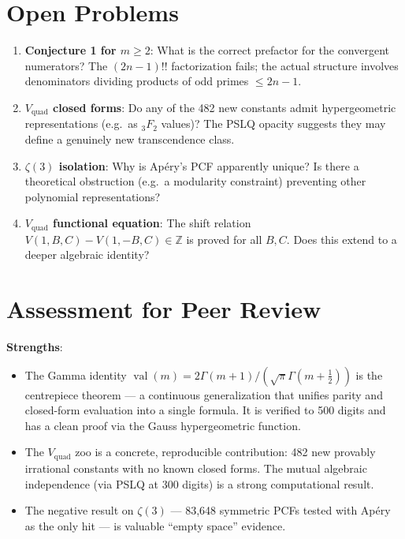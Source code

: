 \documentclass[11pt,a4paper]{article}
\begin{document}
\section{Open Problems}

\begin{enumerate}
\item \textbf{Conjecture 1 for $m \ge 2$}: What is the correct prefactor for the convergent numerators?  The $(2n{-}1)!!$ factorization fails; the actual structure involves denominators dividing products of odd primes $\le 2n{-}1$.
\item \textbf{$V_{\mathrm{quad}}$ closed forms}: Do any of the 482 new constants admit hypergeometric representations (e.g.\ as ${}_3F_2$ values)?  The PSLQ opacity suggests they may define a genuinely new transcendence class.
\item \textbf{$\zeta(3)$ isolation}: Why is Ap\'ery's PCF apparently unique?  Is there a theoretical obstruction (e.g.\ a modularity constraint) preventing other polynomial representations?
\item \textbf{$V_{\mathrm{quad}}$ functional equation}: The shift relation $V(1,B,C) - V(1,-B,C) \in \mathbb{Z}$ is proved for all $B, C$.  Does this extend to a deeper algebraic identity?
\end{enumerate}

\section{Assessment for Peer Review}

\textbf{Strengths}:
\begin{itemize}
\item The Gamma identity $\operatorname{val}(m) = 2\Gamma(m{+}1)/(\sqrt{\pi}\Gamma(m{+}\tfrac{1}{2}))$ is the centrepiece theorem — a continuous generalization that unifies parity and closed-form evaluation into a single formula.  It is verified to 500 digits and has a clean proof via the Gauss hypergeometric function.
\item The $V_{\mathrm{quad}}$ zoo is a concrete, reproducible contribution: 482 new provably irrational constants with no known closed forms.  The mutual algebraic independence (via PSLQ at 300 digits) is a strong computational result.
\item The negative result on $\zeta(3)$ — 83{,}648 symmetric PCFs tested with Ap\'ery as the only hit — is valuable ``empty space'' evidence.
\end{itemize}
\end{document}
